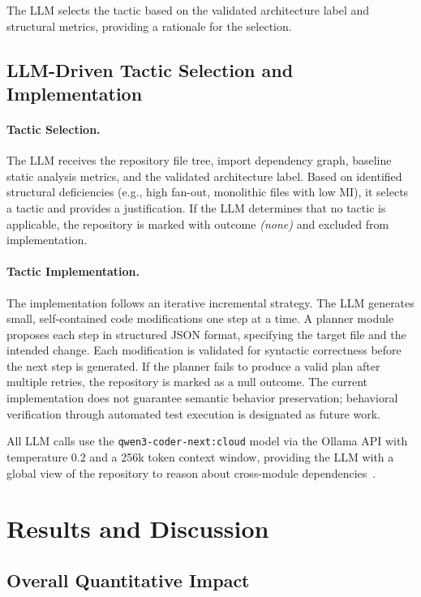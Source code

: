 \documentclass[sigconf,review,anonymous]{acmart}
\begin{document}
The LLM selects the tactic based on the validated architecture label and structural metrics, providing a rationale for the selection.

\subsection{LLM-Driven Tactic Selection and Implementation}

\paragraph{Tactic Selection.} The LLM receives the repository file tree, import dependency graph, baseline static analysis metrics, and the validated architecture label. Based on identified structural deficiencies (e.g., high fan-out, monolithic files with low MI), it selects a tactic and provides a justification. If the LLM determines that no tactic is applicable, the repository is marked with outcome \textit{(none)} and excluded from implementation.

\paragraph{Tactic Implementation.} The implementation follows an iterative incremental strategy. The LLM generates small, self-contained code modifications one step at a time. A planner module proposes each step in structured JSON format, specifying the target file and the intended change. Each modification is validated for syntactic correctness before the next step is generated. If the planner fails to produce a valid plan after multiple retries, the repository is marked as a null outcome. The current implementation does not guarantee semantic behavior preservation; behavioral verification through automated test execution is designated as future work.

All LLM calls use the \texttt{qwen3-coder-next:cloud} model via the Ollama API with temperature 0.2 and a 256k token context window, providing the LLM with a global view of the repository to reason about cross-module dependencies~\cite{piao2025refactoring}.

\section{Results and Discussion}

\subsection{Overall Quantitative Impact}
\end{document}

